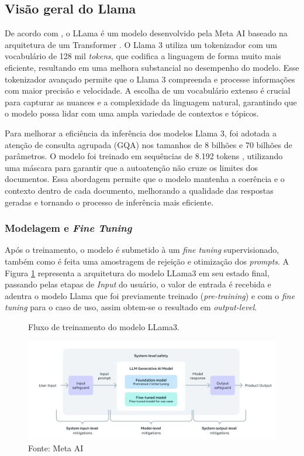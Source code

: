 
\subsection{Visão geral do Llama}
\label{llama}
De acordo com \cite{touvron2023llamaopenefficientfoundation}, o LLama é um modelo desenvolvido pela Meta AI baseado na arquitetura de um Transformer \cite{vaswani2023attentionneed}. O Llama 3 utiliza um tokenizador com um vocabulário de 128 mil \textit{tokens}, que codifica a linguagem de forma muito mais eficiente, resultando em uma melhora substancial no desempenho do modelo. Esse tokenizador avançado permite que o Llama 3 compreenda e processe informações com maior precisão e velocidade. A escolha de um vocabulário extenso é crucial para capturar as nuances e a complexidade da linguagem natural, garantindo que o modelo possa lidar com uma ampla variedade de contextos e tópicos.

Para melhorar a eficiência da inferência dos modelos Llama 3, foi adotada a atenção de consulta agrupada (GQA) nos tamanhos de 8 bilhões e 70 bilhões de parâmetros. O modelo foi treinado em sequências de 8.192 tokens \cite{vaswani2023attentionneed}, utilizando uma máscara para garantir que a autoatenção não cruze os limites dos documentos. Essa abordagem permite que o modelo mantenha a coerência e o contexto dentro de cada documento, melhorando a qualidade das respostas geradas e tornando o processo de inferência mais eficiente.

\subsubsection{Modelagem e \textit{Fine Tuning}}
Após o treinamento, o modelo é submetido à um\textit{ fine tuning} supervisionado, também como é feita uma amostragem de rejeição e otimização dos \textit{prompts}. A Figura \ref{fig:llama1} representa a arquitetura do modelo LLama3 em seu estado final, passando pelas etapas de \textit{Input} do usuário, o valor de entrada é recebida e adentra o modelo Llama que foi previamente treinado (\textit{pre-training}) e com o \textit{fine tuning} para o caso de uso, assim obtem-se o resultado em \textit{output-level}.

\begin{figure}[H]
    \centering
    \caption{Fluxo de treinamento do modelo LLama3.}
    \includegraphics[width=\linewidth]{img/LLAMA/llama.png}
    \caption*{Fonte: Meta AI \cite{llama3blog}}
    \label{fig:llama1}
\end{figure}

